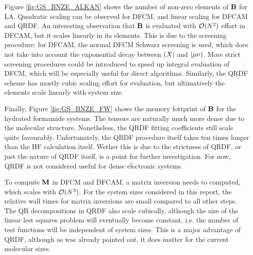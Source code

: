 Figure \ref{fig:GS_BNZE_ALKAN} shows the number of non-zero elements of $\mathbf{B}$ for LA. Quadratic scaling can be observed for DFCM, and linear scaling for DFCAM and QRDF. An interesting observation that $\mathbf{B}$ is evaluated with $\mathcal{O}(N^{2})$ effort in DFCAM, but it scales linearly in its elements. This is due to the screening procedure: for DFCAM, the normal DFCM Schwarz screening is used, which does not take into account the exponential decay between $\left( X \right\rvert$ and $\left\lvert \mu\nu \right)$. More strict screening procedures could be introduced to speed up integral evaluation of DFCM, which will be especially useful for direct algorithms. Similarly, the QRDF scheme has mostly cubic scaling effort for evaluation, but ultimatively the elements scale linearly with system size. 

Finally, Figure \ref{fig:GS_BNZE_FW} shows the memory fottprint of $\mathbf{B}$ for the hydrated formamide systems. The tensors are naturally much more dense due to the molecular structure. Nonetheless, the QRDF fitting coefficients still scale quite favourably. Unfortunately, the QRDF procedure itself takes ten times longer than the HF calculation itself. Wether this is due to the strictness of QRDF, or just the nature of QRDF itself, is a point for further investigation. For now, QRDF is not considered useful for dense electronic systems. 

To compute $\mathbf{M}$ in DFCM and DFCAM, a matrix inversion needs to computed, which scales with $\mathcal{O}(N^{3})$. For the system sizes considered in this report, the relative wall times for matrix inversions are small compared to all other steps. The QR decompositions in QRDF also scale cubically, although the size of the linear lest squares problem will eventually become constant, i.e. the number of test functions will be independent of system sizes. This is a major advantage of QRDF, although as was already pointed out, it does matter for the current molecular sizes.

